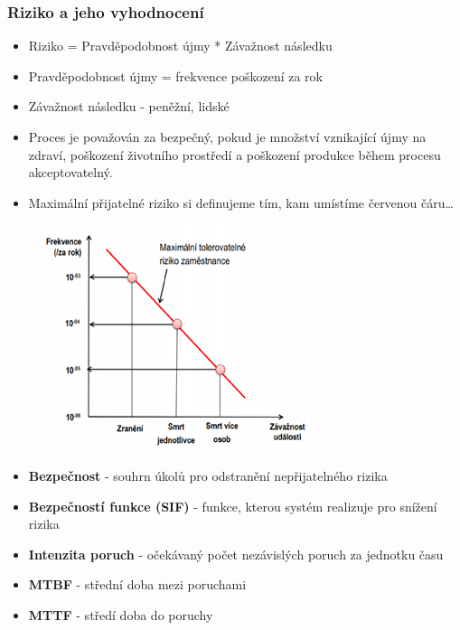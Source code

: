 \subsubsection*{Riziko a jeho vyhodnocení}
\begin{itemize}
    \item Riziko = Pravděpodobnost újmy * Závažnost následku
    \item Pravděpodobnost újmy = frekvence poškození za rok
    \item Závažnost následku - peněžní, lidské
    \item Proces je považován za bezpečný, pokud je množství vznikající újmy na zdraví, poškození životního prostředí a poškození produkce během procesu akceptovatelný.
    \item Maximální přijatelné riziko si definujeme tím, kam umístíme červenou čáru\dots
\end{itemize}

\begin{figure}[h]
    \begin{center}
        \includegraphics[scale = 1]{img/Picture20.png}
    \end{center}
\end{figure}

\begin{itemize}
    \item \textbf{Bezpečnost} - souhrn úkolů pro odstranění nepřijatelného rizika
    \item \textbf{Bezpečností funkce (SIF)} - funkce, kterou systém realizuje pro snížení rizika
    \item \textbf{Intenzita poruch} - očekávaný počet nezávislých poruch za jednotku času
    \item \textbf{MTBF} - střední doba mezi poruchami
    \item \textbf{MTTF} - středí doba do poruchy
\end{itemize}

